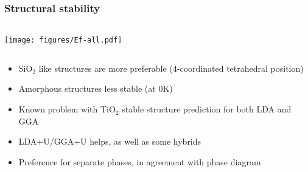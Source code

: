 \documentclass[noamsthm,8pt,t,xcolor={dvipsnames}]{beamer}
\begin{document}
\begin{frame}
   \frametitle{Structural stability}
   \begin{columns}
      \begin{column}{0.55\textwidth}
         \vspace{-0.85cm}
         \begin{center}
            \texttt{[image: figures/Ef-all.pdf]}
         \end{center}
      \end{column}
      \begin{column}{0.45\textwidth}
         \begin{center}
         \end{center}
      \end{column}
   \end{columns}

   \begin{itemize}
      \item SiO$_2$ like structures are more preferable (4-coordinated tetrahedral position)
      \item Amorphous structures less stable (at 0K)
      \item<2-> Known problem with TiO$_2$ stable structure prediction for both LDA and GGA 
      \item<2-> LDA+U/GGA+U helps\footnotemark, as well as some hybrids
      \item<3> Preference for separate phases, in agreement with phase diagram\footnotemark
   \end{itemize}
\end{frame}
\end{document}
